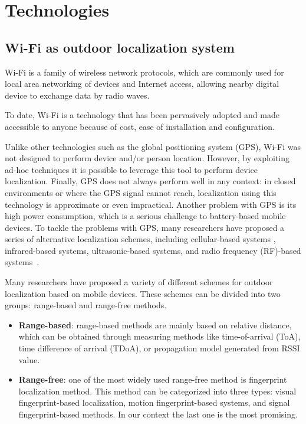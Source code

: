 \section{Technologies}

\subsection{Wi-Fi as outdoor localization system}

Wi-Fi is a family of wireless network protocols, which are commonly used for local area networking of devices and Internet access, allowing nearby digital device to exchange data by radio waves.

To date, Wi-Fi is a technology that has been pervasively adopted and made accessible to anyone because of cost, ease of installation and configuration.

Unlike other technologies such as the global positioning system (GPS), Wi-Fi was not designed to perform device and/or person location. However, by exploiting ad-hoc techniques it is possible
to leverage this tool to perform device localization. Finally, GPS does not always perform well in any context: in closed environments or where the GPS signal cannot reach, localization using
this technology is approximate or even impractical.
Another problem with GPS is its high power consumption, which is a serious challenge to battery-based mobile devices.
To tackle the problems with GPS, many researchers have proposed a series of alternative localization schemes, including cellular-based systems \cite{ibrahim2010cellsense},
infrared-based systems, ultrasonic-based systems, and radio frequency (RF)-based systems~\cite{bahl2000radar, youssef2002probabilistic}.

Many researchers have proposed a variety of different schemes for outdoor localization based on mobile
devices. These schemes can be divided into two groups: range-based and range-free methods.

\begin{itemize}
    \item \textbf{Range-based}: range-based methods are mainly based on relative distance, which can be obtained through measuring methods like time-of-arrival (ToA),
          time difference of arrival (TDoA), or propagation model generated from RSSI value.
    \item \textbf{Range-free}: one of the most widely used range-free method is fingerprint localization method. This method can be categorized into three types: visual fingerprint-based localization, motion fingerprint-based systems, and
          signal fingerprint-based methods. In our context the last one is the most promising.
\end{itemize}

